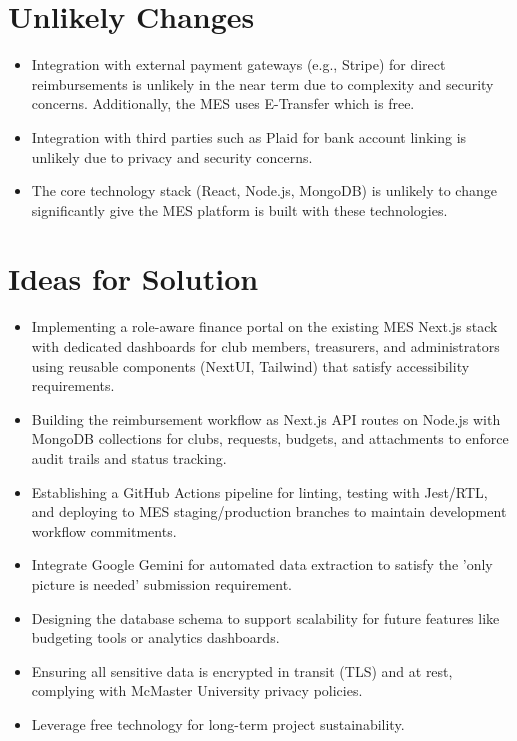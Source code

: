 \documentclass[12pt]{article}
\begin{document}
\section{Unlikely Changes}    
  \begin{itemize}
    \item Integration with external payment gateways (e.g., Stripe) for direct reimbursements is unlikely in the near term due to complexity and security concerns. Additionally, the MES uses E-Transfer which is free.
    \item Integration with third parties such as Plaid for bank account linking is unlikely due to privacy and security concerns.
    \item The core technology stack (React, Node.js, MongoDB) is unlikely to change significantly give the MES platform is built with these technologies.
  \end{itemize}

\section{Ideas for Solution}
  \begin{itemize}
    \item Implementing a role-aware finance portal on the existing MES Next.js stack with dedicated dashboards for club members, treasurers, and administrators using reusable components (NextUI, Tailwind) that satisfy accessibility requirements.
    \item Building the reimbursement workflow as Next.js API routes on Node.js with MongoDB collections for clubs, requests, budgets, and attachments to enforce audit trails and status tracking.
    \item Establishing a GitHub Actions pipeline for linting, testing with Jest/RTL, and deploying to MES staging/production branches to maintain development workflow commitments.
    \item Integrate Google Gemini for automated data extraction to satisfy the 'only picture is needed' submission requirement.
    \item Designing the database schema to support scalability for future features like budgeting tools or analytics dashboards.
    \item Ensuring all sensitive data is encrypted in transit (TLS) and at rest, complying with McMaster University privacy policies.
    \item Leverage free technology for long-term project sustainability. 
  \end{itemize}
\end{document}
